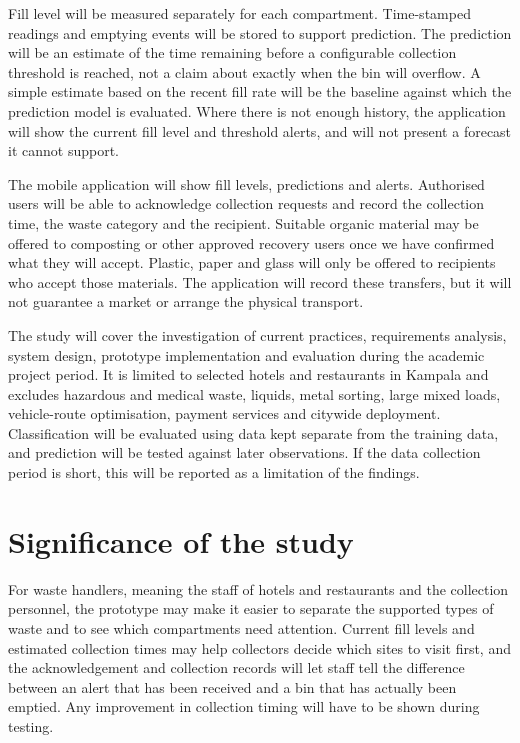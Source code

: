 \documentclass[12pt,a4paper]{report}
\begin{document}
Fill level will be measured separately for each compartment. Time-stamped readings and emptying events will be stored to support prediction. The prediction will be an estimate of the time remaining before a configurable collection threshold is reached, not a claim about exactly when the bin will overflow. A simple estimate based on the recent fill rate will be the baseline against which the prediction model is evaluated. Where there is not enough history, the application will show the current fill level and threshold alerts, and will not present a forecast it cannot support.

The mobile application will show fill levels, predictions and alerts. Authorised users will be able to acknowledge collection requests and record the collection time, the waste category and the recipient. Suitable organic material may be offered to composting or other approved recovery users once we have confirmed what they will accept. Plastic, paper and glass will only be offered to recipients who accept those materials. The application will record these transfers, but it will not guarantee a market or arrange the physical transport.

The study will cover the investigation of current practices, requirements analysis, system design, prototype implementation and evaluation during the academic project period. It is limited to selected hotels and restaurants in Kampala and excludes hazardous and medical waste, liquids, metal sorting, large mixed loads, vehicle-route optimisation, payment services and citywide deployment. Classification will be evaluated using data kept separate from the training data, and prediction will be tested against later observations. If the data collection period is short, this will be reported as a limitation of the findings.

\section{Significance of the study}

For waste handlers, meaning the staff of hotels and restaurants and the collection personnel, the prototype may make it easier to separate the supported types of waste and to see which compartments need attention. Current fill levels and estimated collection times may help collectors decide which sites to visit first, and the acknowledgement and collection records will let staff tell the difference between an alert that has been received and a bin that has actually been emptied. Any improvement in collection timing will have to be shown during testing.
\end{document}
